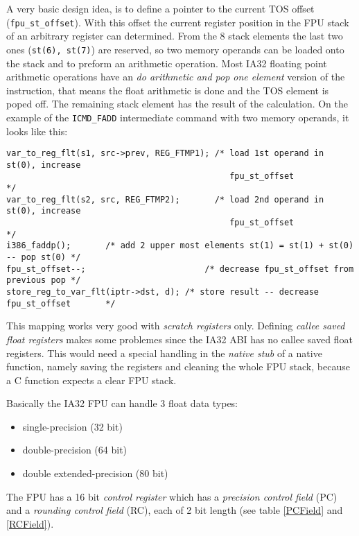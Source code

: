 A very basic design idea, is to define a pointer to the current TOS
offset (\texttt{fpu\_st\_offset}). With this offset the current
register position in the FPU stack of an arbitrary register can
determined. From the 8 stack elements the last two ones
(\texttt{st(6), st(7)}) are reserved, so two memory operands can be
loaded onto the stack and to preform an arithmetic operation. Most
IA32 floating point arithmetic operations have an \textit{do
arithmetic and pop one element} version of the instruction, that means
the float arithmetic is done and the TOS element is poped off. The
remaining stack element has the result of the calculation. On the
example of the \texttt{ICMD\_FADD} intermediate command with two
memory operands, it looks like this:

\begin{verbatim}
var_to_reg_flt(s1, src->prev, REG_FTMP1); /* load 1st operand in st(0), increase
                                             fpu_st_offset                          */
var_to_reg_flt(s2, src, REG_FTMP2);       /* load 2nd operand in st(0), increase
                                             fpu_st_offset                          */
i386_faddp();       /* add 2 upper most elements st(1) = st(1) + st(0) -- pop st(0) */
fpu_st_offset--;                        /* decrease fpu_st_offset from previous pop */
store_reg_to_var_flt(iptr->dst, d); /* store result -- decrease fpu_st_offset       */
\end{verbatim}

This mapping works very good with \textit{scratch registers}
only. Defining \textit{callee saved float registers} makes some
problemes since the IA32 ABI has no callee saved float registers. This
would need a special handling in the \textit{native stub} of a native
function, namely saving the registers and cleaning the whole FPU
stack, because a C function expects a clear FPU stack.

Basically the IA32 FPU can handle 3 float data types:

\begin{itemize}
 \item single-precision (32 bit)
 \item double-precision (64 bit)
 \item double extended-precision (80 bit)
\end{itemize}

The FPU has a 16 bit \textit{control register} which has a
\textit{precision control field} (PC) and a \textit{rounding control
field} (RC), each of 2 bit length (see table \ref{PCField} and
\ref{RCField}).

